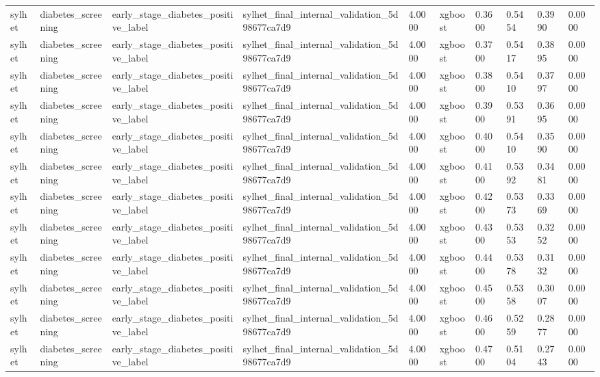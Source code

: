 \begin{tabular}{llllllllll}
sylhet & diabetes\_screening & early\_stage\_diabetes\_positive\_label & sylhet\_final\_internal\_validation\_5d98677ca7d9 & 4.0000 & xgboost & 0.3600 & 0.5454 & 0.3990 & 0.0000 \\
sylhet & diabetes\_screening & early\_stage\_diabetes\_positive\_label & sylhet\_final\_internal\_validation\_5d98677ca7d9 & 4.0000 & xgboost & 0.3700 & 0.5417 & 0.3895 & 0.0000 \\
sylhet & diabetes\_screening & early\_stage\_diabetes\_positive\_label & sylhet\_final\_internal\_validation\_5d98677ca7d9 & 4.0000 & xgboost & 0.3800 & 0.5410 & 0.3797 & 0.0000 \\
sylhet & diabetes\_screening & early\_stage\_diabetes\_positive\_label & sylhet\_final\_internal\_validation\_5d98677ca7d9 & 4.0000 & xgboost & 0.3900 & 0.5391 & 0.3695 & 0.0000 \\
sylhet & diabetes\_screening & early\_stage\_diabetes\_positive\_label & sylhet\_final\_internal\_validation\_5d98677ca7d9 & 4.0000 & xgboost & 0.4000 & 0.5410 & 0.3590 & 0.0000 \\
sylhet & diabetes\_screening & early\_stage\_diabetes\_positive\_label & sylhet\_final\_internal\_validation\_5d98677ca7d9 & 4.0000 & xgboost & 0.4100 & 0.5392 & 0.3481 & 0.0000 \\
sylhet & diabetes\_screening & early\_stage\_diabetes\_positive\_label & sylhet\_final\_internal\_validation\_5d98677ca7d9 & 4.0000 & xgboost & 0.4200 & 0.5373 & 0.3369 & 0.0000 \\
sylhet & diabetes\_screening & early\_stage\_diabetes\_positive\_label & sylhet\_final\_internal\_validation\_5d98677ca7d9 & 4.0000 & xgboost & 0.4300 & 0.5353 & 0.3252 & 0.0000 \\
sylhet & diabetes\_screening & early\_stage\_diabetes\_positive\_label & sylhet\_final\_internal\_validation\_5d98677ca7d9 & 4.0000 & xgboost & 0.4400 & 0.5378 & 0.3132 & 0.0000 \\
sylhet & diabetes\_screening & early\_stage\_diabetes\_positive\_label & sylhet\_final\_internal\_validation\_5d98677ca7d9 & 4.0000 & xgboost & 0.4500 & 0.5358 & 0.3007 & 0.0000 \\
sylhet & diabetes\_screening & early\_stage\_diabetes\_positive\_label & sylhet\_final\_internal\_validation\_5d98677ca7d9 & 4.0000 & xgboost & 0.4600 & 0.5259 & 0.2877 & 0.0000 \\
sylhet & diabetes\_screening & early\_stage\_diabetes\_positive\_label & sylhet\_final\_internal\_validation\_5d98677ca7d9 & 4.0000 & xgboost & 0.4700 & 0.5104 & 0.2743 & 0.0000 \\

\end{tabular}
